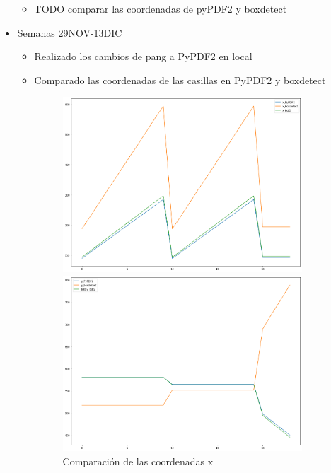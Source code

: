 \begin{itemize}
\begin{itemize}
        \item TODO comparar las coordenadas de pyPDF2 y boxdetect
    \end{itemize}
    \item Semanas 29NOV-13DIC
    \begin{itemize}
        \item Realizado los cambios de pang a PyPDF2 en local
        \item Comparado las coordenadas de las casillas en PyPDF2 y boxdetect
        \begin{figure}
            \centering
            \begin{minipage}{.5\textwidth}
                \centering
                \includegraphics[width=0.9\textwidth]{figures/graph_x.png}
                \caption{Comparación de las coordenadas x}
                \label{fig:graph_x}
            \end{minipage}%
            \begin{minipage}{.5\textwidth}
                \centering
                \includegraphics[width=0.9\textwidth]{figures/graph_y.png}

\end{minipage}
\end{figure}
\end{itemize}
\end{itemize}

